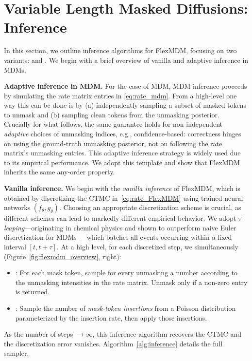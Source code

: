 \section{Variable Length Masked Diffusions: Inference}
\label{sec:FlexMDM_inference}
In this section, we outline inference algorithms for FlexMDM, focusing on two variants:  and . We begin with a brief overview of vanilla and adaptive inference in MDMs.

\textbf{Adaptive inference in MDM.} For the case of MDM, MDM inference proceeds by simulating the rate matrix entries in \ref{eq:rate_mdm}. From a high-level one way this can be done is by (a) independently sampling a subset of masked tokens to unmask and (b) sampling clean tokens from the unmasking posterior. Crucially for what follows, the same guarantee holds for non-independent \emph{adaptive} choices of unmasking indices, e.g., confidence-based: correctness hinges on using the ground-truth unmasking posterior, not on following the rate matrix’s unmasking entries. 
This adaptive inference strategy is widely used due to its empirical performance. We adopt this template and show that FlexMDM inherits the same any-order property.

\textbf{Vanilla inference.} We begin with the \emph{vanilla inference} of FlexMDM, which is obtained by discretizing the CTMC in~\eqref{eq:rate_FlexMDM} using trained neural networks $(f_\theta,g_\theta)$. Choosing an appropriate discretization scheme is crucial, as different schemes can lead to markedly different empirical behavior. We adopt \emph{$\tau$-leaping}—originating in chemical physics and shown to outperform naive Euler discretization for MDMs~\citep{campbell2022continuous}—which batches all events occurring within a fixed interval $[t,t+\tau]$. At a high level, for each discretized step, we simultaneously (Figure~\ref{fig:flexmdm_overview}, right):
\begin{itemize}[leftmargin=*,itemsep=0pt,topsep=0pt]
    \item {}: For each mask token, sample for every unmasking a number according to the unmasking intensities in the rate matrix. Unmask only if a non-zero entry is returned.
    \item {}: Sample the number of \emph{mask-token insertions} from a Poisson distribution parameterized by the insertion rate, then apply those insertions.
\end{itemize}
As the number of steps $\to\infty$, this inference algorithm recovers the CTMC and the discretization error vanishes. Algorithm~\ref{alg:inference} details the full sampler.

